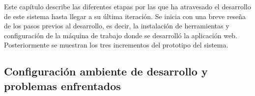 Este capítulo describe las diferentes etapas por las que ha atravesado el desarrollo de
este sistema hasta llegar a su última iteración. Se inicia con una breve reseña de los pasos
previos al desarrollo, es decir, la instalación de herramientas y configuración de la máquina
de trabajo donde se desarrolló la aplicación web. Posteriormente se muestran los tres incrementos del prototipo del sistema.
\subsection{Configuración ambiente de desarrollo y problemas enfrentados}